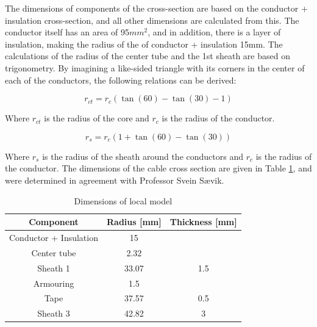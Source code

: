 \noindent The dimensions of components of the cross-section are based on the conductor + insulation cross-section, and all other dimensions are calculated from this. The conductor itself has an area of 95$mm^2$, and in addition, there is a layer of insulation, making the radius of the of conductor + insulation 15mm.  The calculations of the radius of the center tube and the 1st sheath are based on trigonometry. By imagining a like-sided triangle with its corners in the center of each of the conductors, the following relations can be derived: 


  \begin{equation}
   r_{ct} = r_c (\tan(60)-\tan(30)-1)
\end{equation}

 \noindent Where $r_{ct}$ is the radius of the core and $r_c$ is the radius of the conductor.

 \begin{equation}
   r_{s} = r_c (1+\tan(60)-\tan(30))
\end{equation}
 
  \noindent Where $r_{s}$ is the radius of the sheath around the conductors and $r_c$ is the radius of the conductor. \newline
  \newline 
  \noindent The dimensions of the cable cross section are given in Table \ref{table:cabledim}, and were determined in agreement with Professor Svein Sævik.  


\begin{table} [H]
\centering
\begin{tabular}{ |c|c|c|}
\hline
Component & Radius [mm] & Thickness [mm] \\
 \hline
 \hline
 Conductor + Insulation & 15 &\\

 Center tube & 2.32& \\
 
 Sheath 1 & 33.07 & 1.5 \\
 
Armouring & 1.5 &  \\

Tape & 37.57 & 0.5 \\

Sheath 3 & 42.82& 3  \\

 \hline
\end{tabular}
\caption{Dimensions of local model}
\label{table:cabledim}
\end{table} 

